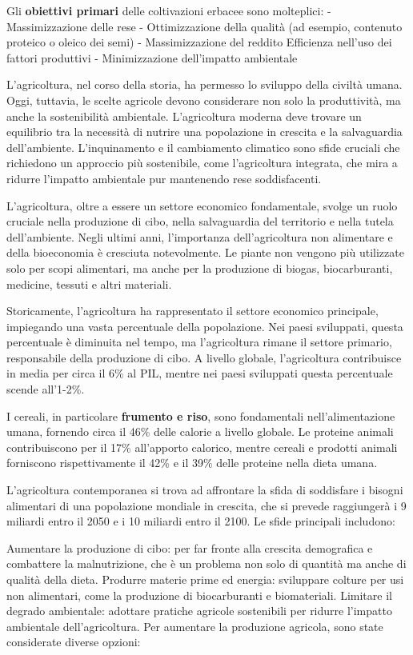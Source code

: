 \documentclass[
]{book}
\theoremstyle{definition}
\theoremstyle{definition}
\theoremstyle{definition}
\theoremstyle{definition}
\theoremstyle{remark}
\begin{document}
Gli \textbf{obiettivi primari} delle coltivazioni erbacee sono molteplici: - Massimizzazione delle rese - Ottimizzazione della qualità (ad esempio, contenuto proteico o oleico dei semi) - Massimizzazione del reddito Efficienza nell'uso dei fattori produttivi - Minimizzazione dell'impatto ambientale

L'agricoltura, nel corso della storia, ha permesso lo sviluppo della civiltà umana. Oggi, tuttavia, le scelte agricole devono considerare non solo la produttività, ma anche la sostenibilità ambientale. L'agricoltura moderna deve trovare un equilibrio tra la necessità di nutrire una popolazione in crescita e la salvaguardia dell'ambiente. L'inquinamento e il cambiamento climatico sono sfide cruciali che richiedono un approccio più sostenibile, come l'agricoltura integrata, che mira a ridurre l'impatto ambientale pur mantenendo rese soddisfacenti.

L'agricoltura, oltre a essere un settore economico fondamentale, svolge un ruolo cruciale nella produzione di cibo, nella salvaguardia del territorio e nella tutela dell'ambiente. Negli ultimi anni, l'importanza dell'agricoltura non alimentare e della bioeconomia è cresciuta notevolmente. Le piante non vengono più utilizzate solo per scopi alimentari, ma anche per la produzione di biogas, biocarburanti, medicine, tessuti e altri materiali.

Storicamente, l'agricoltura ha rappresentato il settore economico principale, impiegando una vasta percentuale della popolazione. Nei paesi sviluppati, questa percentuale è diminuita nel tempo, ma l'agricoltura rimane il settore primario, responsabile della produzione di cibo. A livello globale, l'agricoltura contribuisce in media per circa il 6\% al PIL, mentre nei paesi sviluppati questa percentuale scende all'1-2\%.

I cereali, in particolare \textbf{frumento e riso}, sono fondamentali nell'alimentazione umana, fornendo circa il 46\% delle calorie a livello globale. Le proteine animali contribuiscono per il 17\% all'apporto calorico, mentre cereali e prodotti animali forniscono rispettivamente il 42\% e il 39\% delle proteine nella dieta umana.

L'agricoltura contemporanea si trova ad affrontare la sfida di soddisfare i bisogni alimentari di una popolazione mondiale in crescita, che si prevede raggiungerà i 9 miliardi entro il 2050 e i 10 miliardi entro il 2100. Le sfide principali includono:

Aumentare la produzione di cibo: per far fronte alla crescita demografica e combattere la malnutrizione, che è un problema non solo di quantità ma anche di qualità della dieta. Produrre materie prime ed energia: sviluppare colture per usi non alimentari, come la produzione di biocarburanti e biomateriali. Limitare il degrado ambientale: adottare pratiche agricole sostenibili per ridurre l'impatto ambientale dell'agricoltura. Per aumentare la produzione agricola, sono state considerate diverse opzioni:
\end{document}
